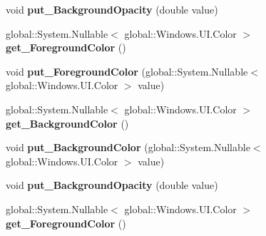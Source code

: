 \begin{DoxyCompactItemize}
\item 
\mbox{\label{interface_windows_1_1_u_i_1_1_view_management_1_1_i_status_bar_af58d730803477f79f79eadd2a909a319}} 
void {\bfseries put\+\_\+\+Background\+Opacity} (double value)
\item 
\mbox{\label{interface_windows_1_1_u_i_1_1_view_management_1_1_i_status_bar_af79d7da2c641f838f1b1ecf0141d571b}} 
global\+::\+System.\+Nullable$<$ global\+::\+Windows.\+U\+I.\+Color $>$ {\bfseries get\+\_\+\+Foreground\+Color} ()
\item 
\mbox{\label{interface_windows_1_1_u_i_1_1_view_management_1_1_i_status_bar_a03c9739bb308ccc616d87f58bc05687f}} 
void {\bfseries put\+\_\+\+Foreground\+Color} (global\+::\+System.\+Nullable$<$ global\+::\+Windows.\+U\+I.\+Color $>$ value)
\item 
\mbox{\label{interface_windows_1_1_u_i_1_1_view_management_1_1_i_status_bar_a9df6bc15ee0dfa95e094167c8cce06b0}} 
global\+::\+System.\+Nullable$<$ global\+::\+Windows.\+U\+I.\+Color $>$ {\bfseries get\+\_\+\+Background\+Color} ()
\item 
\mbox{\label{interface_windows_1_1_u_i_1_1_view_management_1_1_i_status_bar_a8bbd89095cf7637143e01eeacd3b8718}} 
void {\bfseries put\+\_\+\+Background\+Color} (global\+::\+System.\+Nullable$<$ global\+::\+Windows.\+U\+I.\+Color $>$ value)
\item 
\mbox{\label{interface_windows_1_1_u_i_1_1_view_management_1_1_i_status_bar_af58d730803477f79f79eadd2a909a319}} 
void {\bfseries put\+\_\+\+Background\+Opacity} (double value)
\item 
\mbox{\label{interface_windows_1_1_u_i_1_1_view_management_1_1_i_status_bar_af79d7da2c641f838f1b1ecf0141d571b}} 
global\+::\+System.\+Nullable$<$ global\+::\+Windows.\+U\+I.\+Color $>$ {\bfseries get\+\_\+\+Foreground\+Color} ()

\end{DoxyCompactItemize}
